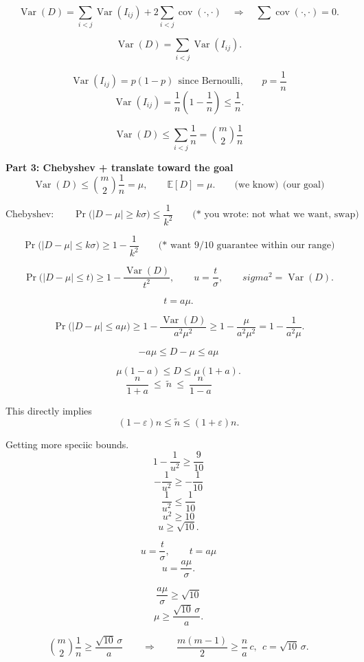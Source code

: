 \documentclass[11pt]{article}
\begin{document}
\begin{enumerate}[label=\arabic*.]
	\[
	\operatorname{Var}(D)
	=\sum_{i<j}\operatorname{Var}(I_{ij})+2\sum_{i<j}\operatorname{cov}(\cdot,\cdot)
	\quad\Rightarrow\quad
	\sum \operatorname{cov}(\cdot,\cdot)=0.
	\]

	\[
	\operatorname{Var}(D)=\sum_{i<j}\operatorname{Var}(I_{ij}).
	\]

	\[
	\operatorname{Var}(I_{ij})=p(1-p)\ \ \text{since Bernoulli,}\qquad
	p=\frac{1}{n}
	\]
	\[
	\operatorname{Var}(I_{ij})=\frac{1}{n}\left(1-\frac{1}{n}\right)\le \frac{1}{n}.
	\]

	\[
	\boxed{
	\operatorname{Var}(D)\le \sum_{i<j}\frac{1}{n}=\binom{m}{2}\frac{1}{n}
	}
	\]

	\textbf{Part 3: Chebyshev + translate toward the goal}
	\[
	\operatorname{Var}(D)\le \binom{m}{2}\frac{1}{n}=\mu,
	\qquad
	\mathbb{E}[D]=\mu.
	\qquad
	\text{(we know)} \ \ \text{(our goal)}
	\]

	\[
	\text{Chebyshev:}\qquad
	\Pr\bigl(|D-\mu|\ge k\sigma\bigr)\le \frac{1}{k^2}
	\qquad
	\text{(* you wrote: not what we want, swap)}
	\]

	\[
	\Pr\bigl(|D-\mu|\le k\sigma\bigr)\ge 1-\frac{1}{k^2}
	\qquad
	\text{(* want }9/10\text{ guarantee within our range)}
	\]

	\[
	\Pr\bigl(|D-\mu|\le t\bigr)\ge 1-\frac{\operatorname{Var}(D)}{t^2},
	\qquad
	u=\frac{t}{\sigma},
	\qquad
	sigma^2=\operatorname{Var}(D).
	\]

	\[
	t=a\mu.
	\]

	\[
	\Pr\bigl(|D-\mu|\le a\mu\bigr)\ge 1-\frac{\operatorname{Var}(D)}{a^2\mu^2}
	\ge 1-\frac{\mu}{a^2\mu^2}
	=1-\frac{1}{a^2\mu}.
	\]

	\[
	-a\mu \le D-\mu \le a\mu
	\]

	\[
	\mu(1-a)\le D \le \mu(1+a).
	\]
    	\[
	\boxed{
	\frac{n}{1+a}\ \le\ \tilde n\ \le\ \frac{n}{1-a}
	}
	\qquad
	\]


	This directly implies
	\[
	(1-\varepsilon)n \le \tilde n \le (1+\varepsilon)n.
	\]

    Getting more speciic bounds.
	\[
	1-\frac{1}{u^2}\ge \frac{9}{10}
	\]
	\[
	-\frac{1}{u^2}\ge -\frac{1}{10}
	\]
	\[
	\frac{1}{u^2}\le \frac{1}{10}
	\]
	\[
	u^2\ge 10
	\]
	\[
	u\ge \sqrt{10}.
	\]

	\[
	u=\frac{t}{\sigma},\qquad t=a\mu
	\]
	\[
	u=\frac{a\mu}{\sigma}.
	\]

	\[
	\frac{a\mu}{\sigma}\ge \sqrt{10}
	\]
	\[
	\mu \ge \frac{\sqrt{10}\,\sigma}{a}.
	\]

	\[
	\binom{m}{2}\frac{1}{n}\ge \frac{\sqrt{10}\,\sigma}{a}
	\qquad\Rightarrow\qquad
	\frac{m(m-1)}{2}\ge \frac{n}{a}\,c,
	\ \ c=\sqrt{10}\,\sigma.
	\]


\end{enumerate}
\end{document}
